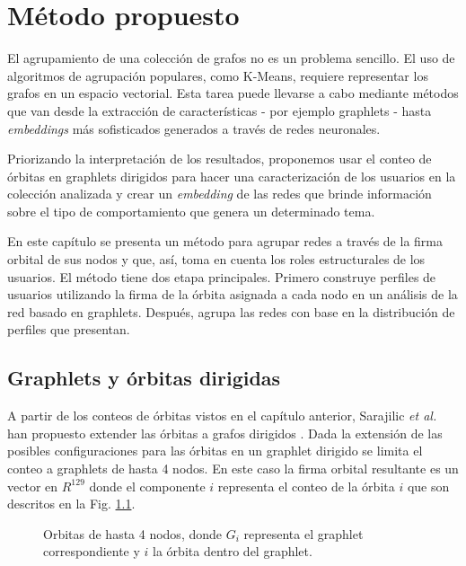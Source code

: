 %
\chapter{Método propuesto}
\label{sec:proposal}


El agrupamiento de una colección de grafos no es un problema sencillo. El uso de algoritmos de agrupación populares, como K-Means, requiere representar los grafos en un espacio vectorial. Esta tarea puede llevarse a cabo mediante métodos que van desde la extracción de características - por ejemplo graphlets - hasta \textit{embeddings} más sofisticados generados a través de redes neuronales. 

Priorizando la interpretación de los resultados, proponemos usar el conteo de órbitas en graphlets dirigidos para hacer una caracterización de los usuarios en la colección analizada y crear un \textit{embedding} de las redes que brinde información sobre el tipo de comportamiento que genera un determinado tema. 

En este capítulo se presenta un método para agrupar redes a través de la firma orbital de sus nodos y que, así, toma en cuenta los roles estructurales de los usuarios. El método tiene dos etapa principales. Primero construye perfiles de usuarios utilizando la firma de la órbita asignada a cada nodo en un análisis de la red basado en graphlets. Después, agrupa las redes con base en la distribución de perfiles que presentan. 

\section{Graphlets y órbitas dirigidas}

A partir de los conteos de órbitas vistos en el capítulo anterior, Sarajilic \textit{et al.} han propuesto extender las órbitas a grafos dirigidos \cite{sarajlic_graphlet-based_2016}. Dada la extensión de las posibles configuraciones para las órbitas en un graphlet dirigido se limita el conteo a graphlets de hasta 4 nodos. En este caso la firma orbital resultante es un vector en $R^{129}$ donde el componente $i$ representa el conteo de la órbita $i$ que son descritos en la Fig. \ref{fig:orbits}.

 \begin{figure}[htbp]
   \centering
   
    \caption{Orbitas de hasta 4 nodos, donde $G_i$ representa el graphlet correspondiente y $i$ la órbita dentro del graphlet.}
    \label{fig:orbits}
\end{figure}


